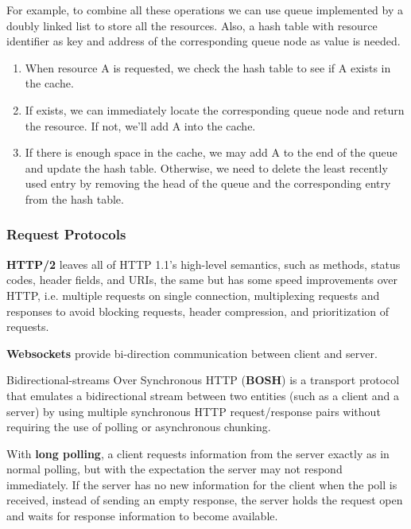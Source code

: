 \documentclass{article}
\begin{document}
    

    For example, to combine all these operations we can use queue implemented by a doubly linked list to store all the resources. Also, a hash table with resource identifier as key and address of the corresponding queue node as value is needed.
    
    \begin{enumerate}
        \item When resource A is requested, we check the hash table to see if A exists in the cache.
        \item If exists, we can immediately locate the corresponding queue node and return the resource. If not, we’ll add A into the cache.
        \item If there is enough space in the cache, we may add A to the end of the queue and update the hash table. Otherwise, we need to delete the least recently used entry by removing the head of the queue and the corresponding entry from the hash table.
    \end{enumerate}  
    
    \subsubsection{Request Protocols}
    \textbf{HTTP/2} leaves all of HTTP 1.1's high-level semantics, such as methods, status codes, header fields, and URIs, the same but has some speed improvements over HTTP, i.e. multiple requests on single connection, multiplexing requests and responses to avoid blocking requests, header compression, and prioritization of requests.
    
    \textbf{Websockets} provide bi-direction communication between client and server.
    
    Bidirectional-streams Over Synchronous HTTP (\textbf{BOSH}) is a transport protocol that emulates a bidirectional stream between two entities (such as a client and a server) by using multiple synchronous HTTP request/response pairs without requiring the use of polling or asynchronous chunking.
    
    With \textbf{long polling}, a client requests information from the server exactly as in normal polling, but with the expectation the server may not respond immediately. If the server has no new information for the client when the poll is received, instead of sending an empty response, the server holds the request open and waits for response information to become available.
    
\end{document}
